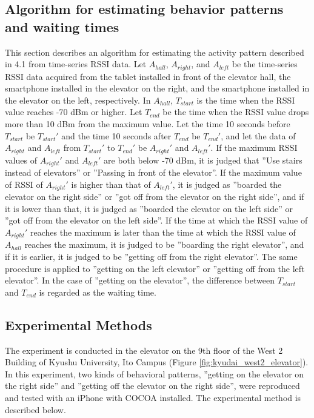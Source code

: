 \subsection{Algorithm for estimating behavior patterns and waiting times}

\thispagestyle{kisuu}

This section describes an algorithm for estimating the activity pattern described in 4.1 from time-series RSSI data.
Let $A_{hall}$, $A_{right}$, and $A_{left}$ be the time-series RSSI data acquired from the tablet installed in front of the elevator hall, the smartphone installed in the elevator on the right, and the smartphone installed in the elevator on the left, respectively. In $A_{hall}$, $T_{start}$ is the time when the RSSI value reaches -70 dBm or higher. Let $T_{end}$ be the time when the RSSI value drops more than 10 dBm from the maximum value. Let the time 10 seconds before $T_{start}$ be $T_{start}'$ and the time 10 seconds after $T_{end}$ be $T_{end}'$, and let the data of $A_{right}$ and $A_{left}$ from $T_{start}'$ to $T_{end}'$ be $A_{right}'$ and $A_{left}'$. If the maximum RSSI values of $A_{right}'$ and $A_{left}'$ are both below -70 dBm, it is judged that ''Use stairs instead of elevators'' or ''Passing in front of the elevator''. If the maximum value of RSSI of $A_{right}'$ is higher than that of $A_{left}'$, it is judged as ''boarded the elevator on the right side'' or ''got off from the elevator on the right side'', and if it is lower than that, it is judged as ''boarded the elevator on the left side'' or ''got off from the elevator on the left side''. If the time at which the RSSI value of $A_{right}'$ reaches the maximum is later than the time at which the RSSI value of $A_{hall}$ reaches the maximum, it is judged to be ''boarding the right elevator'', and if it is earlier, it is judged to be ''getting off from the right elevator''. The same procedure is applied to ''getting on the left elevator'' or ''getting off from the left elevator''. In the case of ''getting on the elevator'', the difference between $T_{start}$ and $T_{end}$ is regarded as the waiting time.


\subsection{Experimental Methods}

The experiment is conducted in the elevator on the 9th floor of the West 2 Building of Kyushu University, Ito Campus (Figure \ref{fig:kyudai_west2_elevator}). In this experiment, two kinds of behavioral patterns, ''getting on the elevator on the right side'' and ''getting off the elevator on the right side'', were reproduced and tested with an iPhone with COCOA installed. The experimental method is described below.

